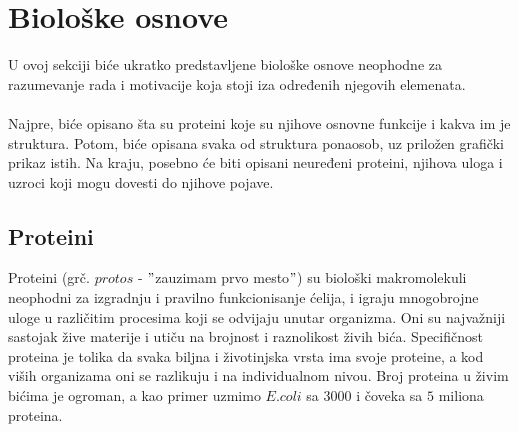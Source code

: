 \chapter{Biološke osnove} %
\label{bioloskeosnove} %

U ovoj sekciji biće ukratko predstavljene biološke osnove neophodne za razumevanje rada i motivacije koja stoji iza određenih njegovih elemenata.\\\\
Najpre, biće opisano šta su proteini koje su njihove osnovne funkcije i kakva im je struktura. Potom, biće opisana svaka od struktura ponaosob, uz priložen grafički prikaz istih. Na kraju, posebno će biti opisani neuređeni proteini, njihova uloga i uzroci koji mogu dovesti do njihove pojave. 

\section{Proteini}
\label{sec:proteini}

Proteini (grč. $protos$ - $"$zauzimam prvo mesto$"$) su biološki makromolekuli neophodni za izgradnju i pravilno funkcionisanje ćelija, i igraju mnogobrojne uloge u različitim procesima koji se odvijaju unutar organizma. Oni su najvažniji sastojak žive materije i utiču na brojnost i raznolikost živih bića. Specifičnost proteina je tolika da svaka biljna i životinjska vrsta ima svoje proteine, a kod viših organizama oni se razlikuju i na individualnom nivou. Broj proteina u živim bićima je ogroman, a kao primer uzmimo $E. coli$ sa $3000$ i čoveka sa $5$ miliona proteina.~\cite{spasic} \\\\

